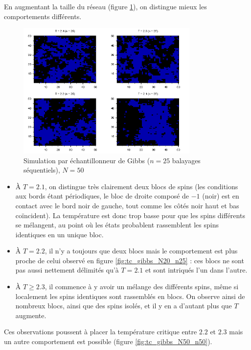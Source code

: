 \documentclass[a4paper,11pt]{article}
\begin{document}
En augmentant la taille du réseau (figure \ref{fig:tc_gibbs_N50_n25}), on distingue mieux les comportements différents.
\begin{figure}[!htbp]
	\label{fig:tc_gibbs_N50_n25}
	\includegraphics[width=0.8\textwidth]{temperature_critique_gibbs_N50_n25.png}
	\caption{Simulation par échantillonneur de Gibbs ($n = 25$ balayages séquentiels), $N = 50$}
\end{figure}
\begin{itemize}
	\item À $T = 2.1$, on distingue très clairement deux blocs de spins (les conditions aux bords étant périodiques, le bloc de droite composé de $-1$ (noir) est en contact avec le bord noir de gauche, tout comme les côtés noir haut et bas coïncident). La température est donc trop basse pour que les spins différents se mélangent, au point où les états probablent rassemblent les spins identiques en un unique bloc.
	\item À $T = 2.2$, il n'y a toujours que deux blocs mais le comportement est plus proche de celui observé en figure \ref{fig:tc_gibbs_N20_n25} : ces blocs ne sont pas aussi nettement délimités qu'à $T = 2.1$ et sont intriqués l'un dans l'autre.
	\item À $T \geq 2.3$, il commence à y avoir un mélange des différents spins, même si localement les spins identiques sont rassemblés en blocs. On observe ainsi de nombreux blocs, ainsi que des spins isolés, et il y en a d'autant plus que $T$ augmente.
\end{itemize}
Ces observations poussent à placer la température critique entre $2.2$ et $2.3$ mais un autre comportement est possible (figure \ref{fig:tc_gibbs_N50_n50}).
\end{document}

